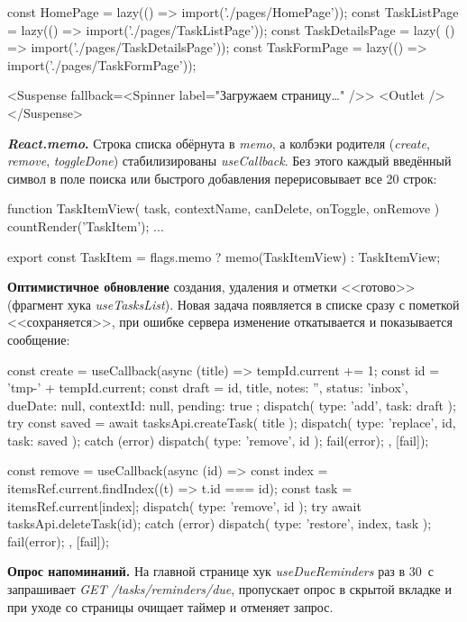 \documentclass{stp}
\newcommand{\en}[1]{\textit{#1}}
\begin{document}
\begin{stplisting}
const HomePage = lazy(() => import('./pages/HomePage'));
const TaskListPage = lazy(() => import('./pages/TaskListPage'));
const TaskDetailsPage = lazy(
  () => import('./pages/TaskDetailsPage'));
const TaskFormPage = lazy(() => import('./pages/TaskFormPage'));

<Suspense fallback={<Spinner label="Загружаем страницу…" />}>
  <Outlet />
</Suspense>
\end{stplisting}

\textbf{\en{React.memo}.} Строка списка обёрнута в \en{memo}, а колбэки
родителя (\en{create}, \en{remove}, \en{toggleDone}) стабилизированы
\en{useCallback}. Без этого каждый введённый символ в поле поиска или
быстрого добавления перерисовывает все 20 строк:

\begin{stplisting}
function TaskItemView({ task, contextName, canDelete,
                        onToggle, onRemove }) {
  countRender('TaskItem');
  ...
}

export const TaskItem =
  flags.memo ? memo(TaskItemView) : TaskItemView;
\end{stplisting}

\textbf{Оптимистичное обновление} создания, удаления и отметки <<готово>>
(фрагмент хука \en{useTasksList}). Новая задача появляется в списке сразу
с пометкой <<сохраняется>>, при ошибке сервера изменение откатывается и
показывается сообщение:

\begin{stplisting}
const create = useCallback(async (title) => {
  tempId.current += 1;
  const id = 'tmp-' + tempId.current;
  const draft = { id, title, notes: '', status: 'inbox',
    dueDate: null, contextId: null, pending: true };
  dispatch({ type: 'add', task: draft });
  try {
    const saved = await tasksApi.createTask({ title });
    dispatch({ type: 'replace', id, task: saved });
  } catch (error) {
    dispatch({ type: 'remove', id });
    fail(error);
  }
}, [fail]);

const remove = useCallback(async (id) => {
  const index = itemsRef.current.findIndex((t) => t.id === id);
  const task = itemsRef.current[index];
  dispatch({ type: 'remove', id });
  try {
    await tasksApi.deleteTask(id);
  } catch (error) {
    dispatch({ type: 'restore', index, task });
    fail(error);
  }
}, [fail]);
\end{stplisting}

\textbf{Опрос напоминаний.} На главной странице хук
\en{useDueReminders} раз в 30~с запрашивает \en{GET /tasks/reminders/due},
пропускает опрос в скрытой вкладке и при уходе со страницы очищает таймер
и отменяет запрос.
\end{document}
